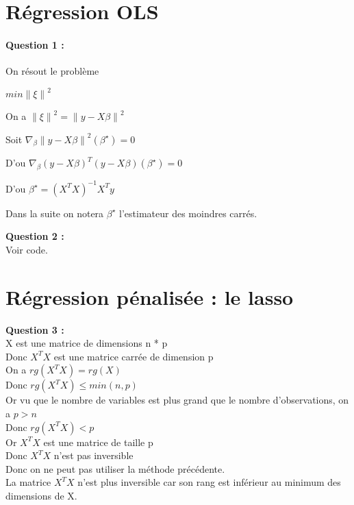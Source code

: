 \documentclass{article}
\newcommand{\norm}[1]{\left\lVert#1\right\rVert^{2}}
\begin{document}





\title{	}


\section{Régression OLS}


\paragraph{Question 1 :}

On résout le problème 

$ min \norm{\xi} $

On a $\norm{\xi} = \norm{ y - X \beta} $
\newline

Soit 
$\nabla_{\beta} \norm{ y - X \beta}(\beta^{\star}) = 0$
\newline

D'ou
$\nabla_{\beta} ( y - X \beta)^{T} ( y - X \beta) (\beta^{\star}) = 0$
\newline

D'ou
$\beta^{\star} = (X^{T}X)^{-1}X^{T}y$

Dans la suite on notera $\beta^{\star}$ l'estimateur des moindres carrés.

\textbf{Question 2 :}
\\Voir code.

\section{Régression pénalisée : le lasso}

\textbf{Question 3 :}
\\X est une matrice de dimensions n * p
\\Donc $X^{T}X$ est une matrice carrée de dimension p
\\On a $rg(X^{T}X) = rg(X)$
\\Donc $rg(X^{T}X) \leq min(n,p)$
\\Or vu que le nombre de variables est plus grand que le nombre d'observations, on a $p > n$
\\Donc $rg(X^{T}X) < p$
\\Or $X^{T}X$ est une matrice de taille p
\\Donc $X^{T}X$ n'est pas inversible
\\Donc on ne peut pas utiliser la méthode précédente.
\\La matrice $X^{T}X$ n'est plus inversible car son rang est inférieur au minimum des dimensions de X.
\end{document}
